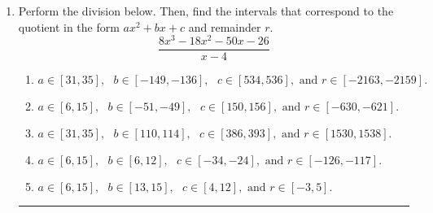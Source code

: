 \documentclass[14pt]{extbook}
\newcommand{\litem}[1]{\item#1\hspace*{-1cm}\rule{\textwidth}{0.4pt}}
\begin{document}
\begin{enumerate}
{\begin{enumerate}[label=\Alph*.]
\end{enumerate} }
\litem{
Perform the division below. Then, find the intervals that correspond to the quotient in the form $ax^2+bx+c$ and remainder $r$.\[ \frac{8x^{3} -18 x^{2} -50 x -26}{x -4} \]\begin{enumerate}[label=\Alph*.]
\item \( a \in [31, 35], \text{   } b \in [-149, -136], \text{   } c \in [534, 536], \text{   and   } r \in [-2163, -2159]. \)
\item \( a \in [6, 15], \text{   } b \in [-51, -49], \text{   } c \in [150, 156], \text{   and   } r \in [-630, -621]. \)
\item \( a \in [31, 35], \text{   } b \in [110, 114], \text{   } c \in [386, 393], \text{   and   } r \in [1530, 1538]. \)
\item \( a \in [6, 15], \text{   } b \in [6, 12], \text{   } c \in [-34, -24], \text{   and   } r \in [-126, -117]. \)
\item \( a \in [6, 15], \text{   } b \in [13, 15], \text{   } c \in [4, 12], \text{   and   } r \in [-3, 5]. \)

\end{enumerate} }
\end{enumerate}
\end{document}

